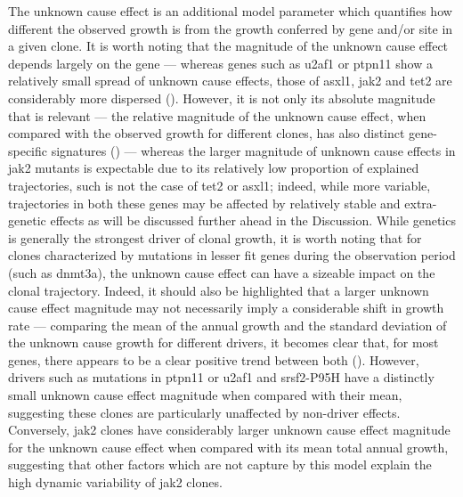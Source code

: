 The unknown cause effect is an additional model parameter which quantifies how different the observed growth is from the growth conferred by gene and/or site in a given clone. It is worth noting that the magnitude of the unknown cause effect depends largely on the gene --- whereas genes such as \ac{u2af1} or \ac{ptpn11} show a relatively small spread of unknown cause effects, those of \ac{asxl1}, \ac{jak2} and \ac{tet2} are considerably more dispersed (). However, it is not only its absolute magnitude that is relevant --- the relative magnitude of the unknown cause effect, when compared with the observed growth for different clones, has also distinct gene-specific signatures () --- whereas the larger magnitude of unknown cause effects in \ac{jak2} mutants is expectable due to its relatively low proportion of explained trajectories, such is not the case of \ac{tet2} or \ac{asxl1}; indeed, while more variable, trajectories in both these genes may be affected by relatively stable and extra-genetic effects as will be discussed further ahead in the Discussion. While genetics is generally the strongest driver of clonal growth, it is worth noting that for clones characterized by mutations in lesser fit genes during the observation period (such as \ac{dnmt3a}), the unknown cause effect can have a sizeable impact on the clonal trajectory. Indeed, it should also be highlighted that a larger unknown cause effect magnitude may not necessarily imply a considerable shift in growth rate --- comparing the mean of the annual growth and the standard deviation of the unknown cause growth for different drivers, it becomes clear that, for most genes, there appears to be a clear positive trend between both (). However, drivers such as mutations in \ac{ptpn11} or \ac{u2af1} and \ac{srsf2}-P95H have a distinctly small unknown cause effect magnitude when compared with their mean, suggesting these clones are particularly unaffected by non-driver effects. Conversely, \ac{jak2} clones have considerably larger unknown cause effect magnitude for the unknown cause effect when compared with its mean total annual growth, suggesting that other factors which are not capture by this model explain the high dynamic variability of \ac{jak2} clones.

\begin{figure}[!ht]
	\label{fig:unknown-by-gene}
\end{figure}

